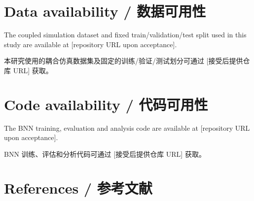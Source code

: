 \documentclass[11pt,a4paper]{article}
\begin{document}
\section*{Data availability / 数据可用性}

The coupled simulation dataset and fixed train/validation/test split
used in this study are available at [repository URL upon acceptance].

本研究使用的耦合仿真数据集及固定的训练/验证/测试划分可通过
[接受后提供仓库 URL] 获取。

\section*{Code availability / 代码可用性}

The BNN training, evaluation and analysis code are available at
[repository URL upon acceptance].

BNN 训练、评估和分析代码可通过 [接受后提供仓库 URL] 获取。

\section*{References / 参考文献}
\end{document}
